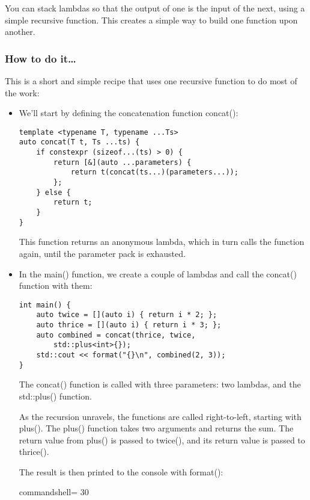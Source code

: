 
You can stack lambdas so that the output of one is the input of the next, using a simple recursive function. This creates a simple way to build one function upon another.

\subsubsection{How to do it…}

This is a short and simple recipe that uses one recursive function to do most of the work:

\begin{itemize}
\item 
We'll start by defining the concatenation function concat():

\begin{lstlisting}[style=styleCXX]
template <typename T, typename ...Ts>
auto concat(T t, Ts ...ts) {
	if constexpr (sizeof...(ts) > 0) {
		return [&](auto ...parameters) {
			return t(concat(ts...)(parameters...));
		};
	} else {
		return t;
	}
}
\end{lstlisting}

This function returns an anonymous lambda, which in turn calls the function again, until the parameter pack is exhausted.

\item 
In the main() function, we create a couple of lambdas and call the concat() function with them:

\begin{lstlisting}[style=styleCXX]
int main() {
	auto twice = [](auto i) { return i * 2; };
	auto thrice = [](auto i) { return i * 3; };
	auto combined = concat(thrice, twice,
		std::plus<int>{});
	std::cout << format("{}\n", combined(2, 3));
}
\end{lstlisting}

The concat() function is called with three parameters: two lambdas, and the std::plus() function.

As the recursion unravels, the functions are called right-to-left, starting with plus(). The plus() function takes two arguments and returns the sum. The return value from plus() is passed to twice(), and its return value is passed to thrice().

The result is then printed to the console with format():

\begin{tcblisting}{commandshell={}}
30
\end{tcblisting}

\end{itemize}

